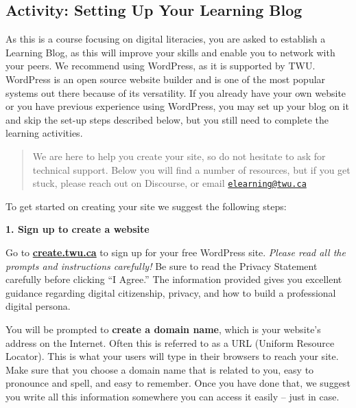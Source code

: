 \documentclass[
]{book}
\theoremstyle{definition}
\theoremstyle{definition}
\theoremstyle{definition}
\theoremstyle{definition}
\theoremstyle{remark}
\begin{document}
\hypertarget{activity-setting-up-your-learning-blog}{%
\subsection*{Activity: Setting Up Your Learning Blog}\label{activity-setting-up-your-learning-blog}}

\begin{reflect}
As this is a course focusing on digital literacies, you are asked to establish a Learning Blog, as this will improve your skills and enable you to network with your peers. We recommend using WordPress, as it is supported by TWU. WordPress is an open source website builder and is one of the most popular systems out there because of its versatility. If you already have your own website or you have previous experience using WordPress, you may set up your blog on it and skip the set-up steps described below, but you still need to complete the learning activities.

\begin{quote}
We are here to help you create your site, so do not hesitate to ask for technical support. Below you will find a number of resources, but if you get stuck, please reach out on Discourse, or email \href{mailto:elearning@twu.ca}{\nolinkurl{elearning@twu.ca}}
\end{quote}

To get started on creating your site we suggest the following steps:

\textbf{1. Sign up to create a website}

Go to \textbf{\href{https://create.twu.ca/}{create.twu.ca}} to sign up for your free WordPress site. \emph{Please read all the prompts and instructions carefully!}
Be sure to read the Privacy Statement carefully before clicking ``I Agree.'' The information provided gives you excellent guidance regarding digital citizenship, privacy, and how to build a professional digital persona.

You will be prompted to \textbf{create a domain name}, which is your website's address on the Internet. Often this is referred to as a URL (Uniform Resource Locator). This is what your users will type in their browsers to reach your site. Make sure that you choose a domain name that is related to you, easy to pronounce and spell, and easy to remember. Once you have done that, we suggest you write all this information somewhere you can access it easily -- just in case.


\end{reflect}
\end{document}
